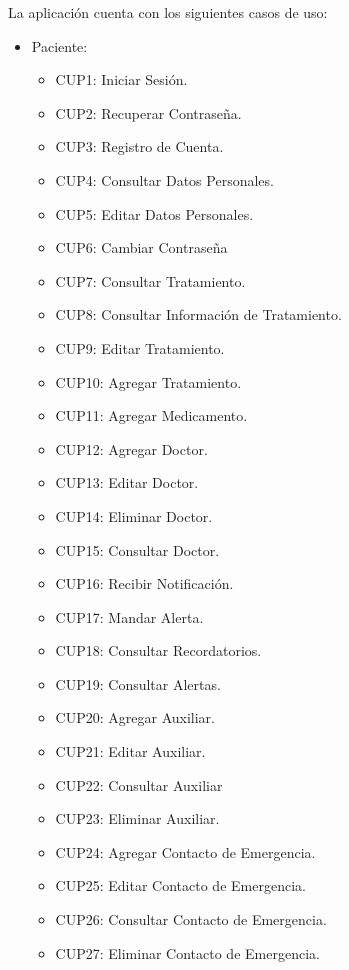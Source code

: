 La aplicación cuenta con los siguientes casos de uso:
\begin{itemize}
	\item Paciente:
		\begin{itemize}
			\item CUP1: Iniciar Sesión.
			\item CUP2: Recuperar Contraseña.
			\item CUP3: Registro de Cuenta.
			\item CUP4: Consultar Datos Personales.
			\item CUP5: Editar Datos Personales.
			\item CUP6: Cambiar Contraseña
			\item CUP7: Consultar Tratamiento.
			\item CUP8: Consultar Información de Tratamiento.
			\item CUP9: Editar Tratamiento.
			\item CUP10: Agregar Tratamiento.
			\item CUP11: Agregar Medicamento.
			\item CUP12: Agregar Doctor.
			\item CUP13: Editar Doctor.
			\item CUP14: Eliminar Doctor.
			\item CUP15: Consultar Doctor.
			\item CUP16: Recibir Notificación.
			\item CUP17: Mandar Alerta.
			\item CUP18: Consultar Recordatorios.
			\item CUP19: Consultar Alertas.
			\item CUP20: Agregar Auxiliar.
			\item CUP21: Editar Auxiliar.
			\item CUP22: Consultar Auxiliar
			\item CUP23: Eliminar Auxiliar.
			\item CUP24: Agregar Contacto de Emergencia.
			\item CUP25: Editar Contacto de Emergencia.
			\item CUP26: Consultar Contacto de Emergencia.
			\item CUP27: Eliminar Contacto de Emergencia.
		\end{itemize}
	
\end{itemize}
